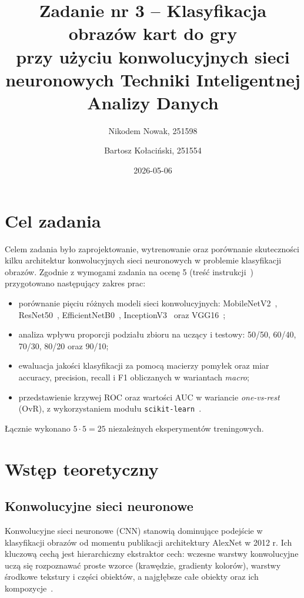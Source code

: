\documentclass[12pt]{article}
\title{{\bf Zadanie nr 3 -- Klasyfikacja obrazów kart do gry\\przy użyciu konwolucyjnych sieci neuronowych}\linebreak
Techniki Inteligentnej Analizy Danych}
\author{Nikodem Nowak, 251598 \and Bartosz Kołaciński, 251554}
\date{2026-05-06}
\begin{document}
\clearpage\maketitle
\thispagestyle{empty}
\newpage
\tableofcontents
\thispagestyle{empty}
\newpage
\setcounter{page}{1}

\section{Cel zadania}

Celem zadania było zaprojektowanie, wytrenowanie oraz porównanie skuteczności kilku architektur konwolucyjnych sieci neuronowych w problemie klasyfikacji obrazów. Zgodnie z wymogami zadania na ocenę 5 (treść instrukcji~\cite{wikamp_zad3}) przygotowano następujący zakres prac:

\begin{itemize}
  \item porównanie pięciu różnych modeli sieci konwolucyjnych: MobileNetV2~\cite{mobilenetv2}, ResNet50~\cite{resnet}, EfficientNetB0~\cite{efficientnet}, InceptionV3~\cite{inceptionv3} oraz VGG16~\cite{vgg};
  \item analiza wpływu proporcji podziału zbioru na uczący i testowy: 50/50, 60/40, 70/30, 80/20 oraz 90/10;
  \item ewaluacja jakości klasyfikacji za pomocą macierzy pomyłek oraz miar accuracy, precision, recall i F1 obliczanych w wariantach \textit{macro};
  \item przedstawienie krzywej ROC oraz wartości AUC w wariancie \textit{one-vs-rest} (OvR), z wykorzystaniem modułu \texttt{scikit-learn}~\cite{sklearn}.
\end{itemize}

Łącznie wykonano $5 \cdot 5 = 25$ niezależnych eksperymentów treningowych.

\section{Wstęp teoretyczny}

\subsection{Konwolucyjne sieci neuronowe}

Konwolucyjne sieci neuronowe (CNN) stanowią dominujące podejście w klasyfikacji obrazów od momentu publikacji architektury AlexNet w 2012 r. Ich kluczową cechą jest hierarchiczny ekstraktor cech: wczesne warstwy konwolucyjne uczą się rozpoznawać proste wzorce (krawędzie, gradienty kolorów), warstwy środkowe tekstury i części obiektów, a najgłębsze całe obiekty oraz ich kompozycje~\cite{vgg}.
\end{document}
